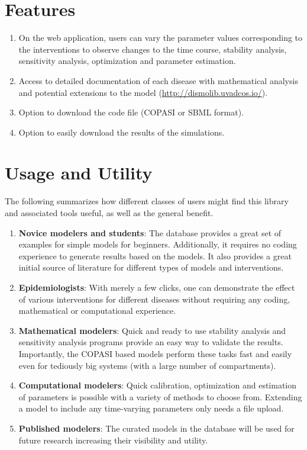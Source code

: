 \documentclass{article}
\begin{document}
\section{Features}
\begin{enumerate}
    \item On the web application, users can vary the parameter values corresponding to the interventions to observe changes to the time course, stability analysis, sensitivity analysis, optimization and parameter estimation.
    \item Access to detailed documentation of each disease with mathematical analysis and potential extensions to the model (\url{http://dismolib.uvadcos.io/}).
    \item Option to download the code file (COPASI or SBML format).
    \item Option to easily download the results of the simulations.
\end{enumerate}


\section{Usage and Utility }
The following summarizes how different classes of users might find this library and associated tools useful, as well as the general benefit.
\begin{enumerate}
    \item \textbf{Novice modelers and students}: The database provides a great set of examples for simple models for beginners. Additionally, it requires no coding experience to generate results based on the models. It also provides a great initial source of literature for different types of models and interventions.
    \item \textbf{Epidemiologists}: With merely a few clicks, one can demonstrate the effect of various interventions for different diseases without requiring any coding, mathematical or computational experience.
    \item \textbf{Mathematical modelers}: Quick and ready to use stability analysis and sensitivity analysis programs provide an easy way to validate the results. Importantly, the COPASI based models perform these tasks fast and easily even for tediously big systems (with a large number of compartments).
    \item \textbf{Computational modelers}: Quick calibration, optimization and estimation of parameters is possible with a variety of methods to choose from. Extending a model to include any time-varying parameters only needs a file upload. 
    \item \textbf{Published modelers}: The curated models in the database will be used for future research increasing their visibility and utility.
\end{enumerate}
\end{document}
